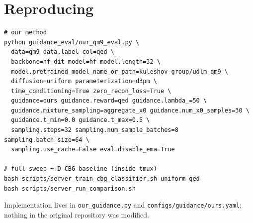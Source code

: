\documentclass[11pt]{article}
\begin{document}
\section{Reproducing}

\begin{verbatim}
# our method
python guidance_eval/our_qm9_eval.py \
  data=qm9 data.label_col=qed \
  backbone=hf_dit model=hf model.length=32 \
  model.pretrained_model_name_or_path=kuleshov-group/udlm-qm9 \
  diffusion=uniform parameterization=d3pm \
  time_conditioning=True zero_recon_loss=True \
  guidance=ours guidance.reward=qed guidance.lambda_=50 \
  guidance.mixture_sampling=aggregate_x0 guidance.num_x0_samples=30 \
  guidance.t_min=0.0 guidance.t_max=0.5 \
  sampling.steps=32 sampling.num_sample_batches=8 sampling.batch_size=64 \
  sampling.use_cache=False eval.disable_ema=True

# full sweep + D-CBG baseline (inside tmux)
bash scripts/server_train_cbg_classifier.sh uniform qed
bash scripts/server_run_comparison.sh
\end{verbatim}

Implementation lives in \texttt{our\_guidance.py} and
\texttt{configs/guidance/ours.yaml}; nothing in the original repository was
modified.
\end{document}
